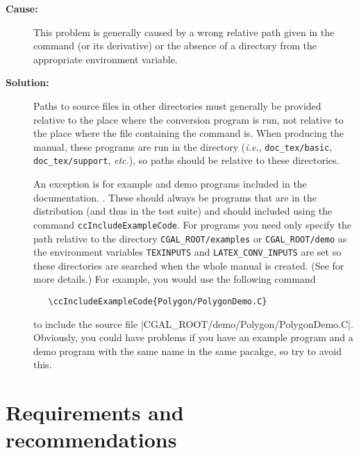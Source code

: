 \begin{description}
\item[{\bf Cause:}] This problem is generally caused by a wrong relative path
given in the \verb|| command (or its derivative) or the absence of a 
directory from the appropriate environment variable.

\item[{\bf Solution:}] Paths to source files in other directories must 
generally be provided relative to the place where the conversion program is 
run, not relative to the place where the file containing the command is.  When 
producing the manual, these programs are run in the  
directory ({\em i.e.}, {\tt doc\_tex/basic}, {\tt doc\_tex/support}, 
{\em etc.}), so paths should be relative to these directories.  

An exception is for example and demo programs included in the documentation.
.  These should always
be programs that are in the distribution (and thus in the test suite)
and should included using the command \texttt{ccIncludeExampleCode}.  For 
programs you need only specify the path relative to the directory 
\texttt{CGAL\_ROOT/examples} or \texttt{CGAL\_ROOT/demo} as the environment 
variables \texttt{TEXINPUTS} and \texttt{LATEX\_CONV\_INPUTS} are set so these 
directories are searched when the whole manual is created.  
(See
for more details.)
For example,
you would use the following command
\begin{verbatim}
   \ccIncludeExampleCode{Polygon/PolygonDemo.C}
\end{verbatim}
to include the source file \nonlinkedpath|CGAL_ROOT/demo/Polygon/PolygonDemo.C|.
Obviously, you could have problems if you have an example program and a demo
program with the same name in the same pacakge, so try to avoid this.
\end{description}


\section{Requirements and recommendations}
\label{sec:specification_req_and_rec}

